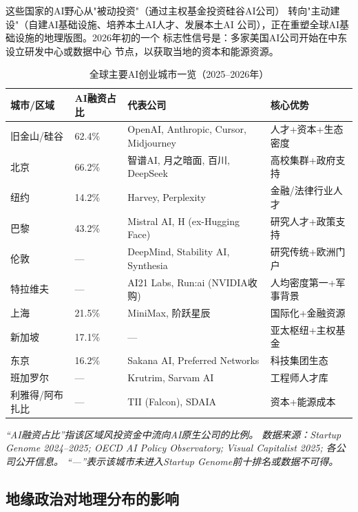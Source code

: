 这些国家的AI野心从"被动投资"（通过主权基金投资硅谷AI公司）
转向"主动建设"（自建AI基础设施、培养本土AI人才、发展本土AI
公司），正在重塑全球AI基础设施的地理版图。2026年初的一个
标志性信号是：多家美国AI公司开始在中东设立研发中心或数据中心
节点，以获取当地的资本和能源资源。

\begin{table}[htbp]
\centering
\caption{全球主要AI创业城市一览（2025--2026年）}
\label{tab:geo-overview}
\small
\begin{tabularx}{\textwidth}{l l X l}
\toprule
\rowcolor{figLightGray}
\textbf{城市/区域} & \textbf{AI融资占比} & \textbf{代表公司}
  & \textbf{核心优势} \\
\midrule
旧金山/硅谷 & 62.4\%
  & OpenAI, Anthropic, Cursor, Midjourney
  & 人才+资本+生态密度 \\
\rowcolor{figLightGray}
北京 & 66.2\%
  & 智谱AI, 月之暗面, 百川, DeepSeek
  & 高校集群+政府支持 \\
纽约 & 14.2\%
  & Harvey, Perplexity
  & 金融/法律行业人才 \\
\rowcolor{figLightGray}
巴黎 & 43.2\%
  & Mistral AI, H (ex-Hugging Face)
  & 研究人才+政策支持 \\
伦敦 & ---
  & DeepMind, Stability AI, Synthesia
  & 研究传统+欧洲门户 \\
\rowcolor{figLightGray}
特拉维夫 & ---
  & AI21 Labs, Run:ai (NVIDIA收购)
  & 人均密度第一+军事背景 \\
上海 & 21.5\%
  & MiniMax, 阶跃星辰
  & 国际化+金融资源 \\
\rowcolor{figLightGray}
新加坡 & 17.1\%
  & ---
  & 亚太枢纽+主权基金 \\
东京 & 16.2\%
  & Sakana AI, Preferred Networks
  & 科技集团生态 \\
\rowcolor{figLightGray}
班加罗尔 & ---
  & Krutrim, Sarvam AI
  & 工程师人才库 \\
利雅得/阿布扎比 & ---
  & TII (Falcon), SDAIA
  & 资本+能源成本 \\
\bottomrule
\end{tabularx}

\medskip
\noindent\textit{``AI融资占比''指该区域风投资金中流向AI原生公司的比例。
数据来源：Startup Genome 2024--2025; OECD AI Policy Observatory;
Visual Capitalist 2025; 各公司公开信息。
``---''表示该城市未进入Startup Genome前十排名或数据不可得。}
\end{table}

\subsection{地缘政治对地理分布的影响}

